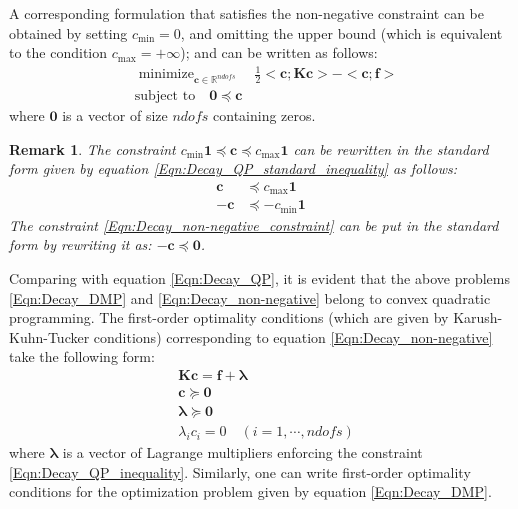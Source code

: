 \documentclass[11pt]{amsart}
\newtheorem{remark}[theorem]{Remark}
\begin{document}
A corresponding formulation that satisfies the non-negative constraint can be obtained 
by setting $c_{\mathrm{min}} = 0$, and omitting the upper bound (which is equivalent to 
the condition $c_{\mathrm{max}} = +\infty$); and can be written as follows:
\begin{subequations}
  \label{Eqn:Decay_non-negative}
  \begin{align}
    &\mathop{\mbox{minimize}}_{\boldsymbol{c} \in \mathbb{R}^{ndofs}} \quad  
    \frac{1}{2} <\boldsymbol{c}; \boldsymbol{K}  \boldsymbol{c}>  - 
    <\boldsymbol{c}; \boldsymbol{f}> \\
\label{Eqn:Decay_non-negative_constraint}
    &\mbox{subject to} \quad \boldsymbol{0} \preceq \boldsymbol{c}  
  \end{align}
\end{subequations}
where $\boldsymbol{0}$ is a vector of size $ndofs$ containing zeros. 
\begin{remark}
  The constraint $c_{\mathrm{min}} \boldsymbol{1} \preceq \boldsymbol{c} \preceq 
  c_{\mathrm{max}} \boldsymbol{1}$ can be rewritten in the standard form given by 
  equation \eqref{Eqn:Decay_QP_standard_inequality} as follows:
  \begin{subequations}
    \begin{align*}
      \boldsymbol{c} &\preceq c_{\mathrm{max}} \boldsymbol{1} \\
      - \boldsymbol{c} &\preceq -c_{\mathrm{min}} \boldsymbol{1} 
    \end{align*}
  \end{subequations}
  The constraint \eqref{Eqn:Decay_non-negative_constraint} can be put in the 
  standard form by rewriting it as: $-\boldsymbol{c} \preceq \boldsymbol{0}$.
\end{remark}

Comparing with equation \eqref{Eqn:Decay_QP}, it is evident that the above problems  
\eqref{Eqn:Decay_DMP} and \eqref{Eqn:Decay_non-negative} belong to convex quadratic 
programming. The first-order optimality conditions (which are given by Karush-Kuhn-Tucker 
conditions) corresponding to equation \eqref{Eqn:Decay_non-negative} take the following 
form:
\begin{subequations}
  \label{Eqn:Decay_first_order_optimality}
  \begin{align}
    &\boldsymbol{K} \boldsymbol{c} = \boldsymbol{f} + \boldsymbol{\lambda} \\
    \label{Eqn:Decay_QP_inequality}
    &\boldsymbol{c} \succeq \boldsymbol{0} \\
    \label{Eqn:Decay_QP_lambda_inequality}
    &\boldsymbol{\lambda} \succeq \boldsymbol{0} \\
    \label{Eqn:Decay_QP_complementary_conditions}
    &\lambda_{i} c_{i} = 0 \quad (i = 1, \cdots, ndofs)
  \end{align}
\end{subequations}
where $\boldsymbol{\lambda}$ is a vector of Lagrange multipliers enforcing 
the constraint \eqref{Eqn:Decay_QP_inequality}. Similarly, one can write 
first-order optimality conditions for the optimization problem given by 
equation \eqref{Eqn:Decay_DMP}.
\end{document}
